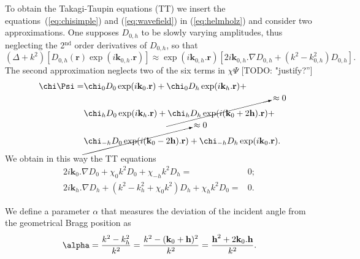 \documentclass[preprint]{iucr}              %
\newcommand{\todo}[1]{{\color{red}[TODO: "#1'']}}
\begin{document}
To obtain the Takagi-Taupin equations (TT) we insert the equations~(\ref{eq:chisimple}) and (\ref{eq:wavefield}) in (\ref{eq:helmholz}) and consider two approximations. One supposes $D_{0,h}$ to be slowly varying amplitudes, thus neglecting the 2$^{\text{nd}}$ order derivatives of $D_{0,h}$,  so that
\begin{equation}
\label{eq:approxslowlyvarying}
(\Delta + k^2)[D_{0,h}(\textbf{r}) \exp(i\textbf{k}_{0,h} . \textbf{r})] \approx \exp(i\textbf{k}_{0,h} . \textbf{r}) [2 i \textbf{k}_{0,h} . \nabla D_{0,h} + (k^2 - k^2_{0,h}) D_{0,h}].
\end{equation}
The second approximation neglects two of the six terms in $\chi \Psi$ \todo{justify?}
\begin{subequations}
\label{eq:approxchiPsi}
\begin{align}
\chi\Psi =&
\chi_0 D_0 \exp(i \textbf{k}_0 . \textbf{r}) +
\chi_0 D_h \exp(i \textbf{k}_h . \textbf{r}) +\\
&\chi_h D_0 \exp(i \textbf{k}_h . \textbf{r}) +
\cancelto{\approx 0}{\chi_h D_h \exp(i (\textbf{k}_0+2\textbf{h}) . \textbf{r})} +\\
&\cancelto{\approx 0}{\chi_{-h} D_0 \exp(i (\textbf{k}_0 - 2 \textbf{h}) .\textbf{r})} +
\chi_{-h} D_h \exp(i \textbf{k}_0 . \textbf{r}) .
\end{align}
\end{subequations}
We obtain in this way the TT equations 
\begin{subequations}
\label{eq:TTvector}
\begin{align}
2 i \textbf{k}_0 . \nabla D_0 + \chi_0 k^2 D_0 + \chi_{-h} k^2 D_h =& 0; \\
2 i \textbf{k}_h . \nabla D_h + (k^2 - k_h^2 + \chi_0 k^2) D_h + \chi_{h} k^2 D_0 =& 0.
\end{align}
\end{subequations}

We define a parameter $\alpha$ that measures the deviation of the incident angle from the geometrical Bragg position as
\begin{equation}
\label{eq:alpha}
\alpha = \frac{k^2-k_h^2}{k^2} = \frac{k^2-(\textbf k_0 + \textbf h)^2}{k^2} = \frac{\textbf h^2 + 2 \textbf k_0 . \textbf h}{k^2}.
\end{equation}
\end{document}
